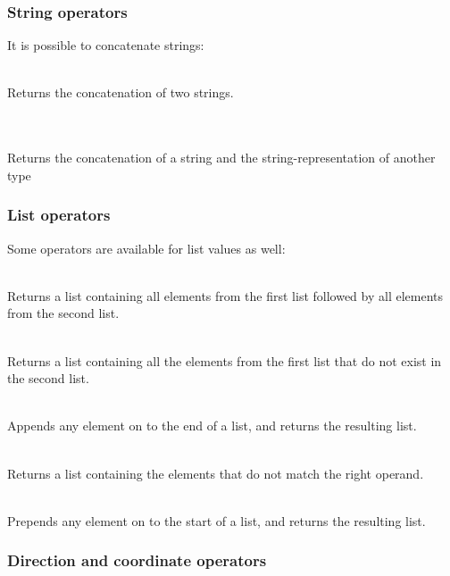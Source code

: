 \subsubsection{String operators}

It is possible to concatenate strings:
\begin{dlist}
  \item {} \\
    Returns the concatenation of two strings.
  \item {} \\
    \\
    Returns the concatenation of a string and the string-representation of another type
\end{dlist}

\subsubsection{List operators}

Some operators are available for list values as well:
\begin{dlist}
\item {} \\
  Returns a list containing all elements from the first list followed
  by all elements from the second list.
\item {} \\
  Returns a list containing all the elements from the first list that
  do not exist in the second list.
\item {} \\
  Appends any element on to the end of a list, and returns the resulting list.
\item \operator[List]{-}{\opstar} \\
  Returns a list containing the elements that do not match the right operand.
\item {} \\
  Prepends any element on to the start of a list, and returns the resulting list.
\end{dlist}

\subsubsection{Direction and coordinate operators}

